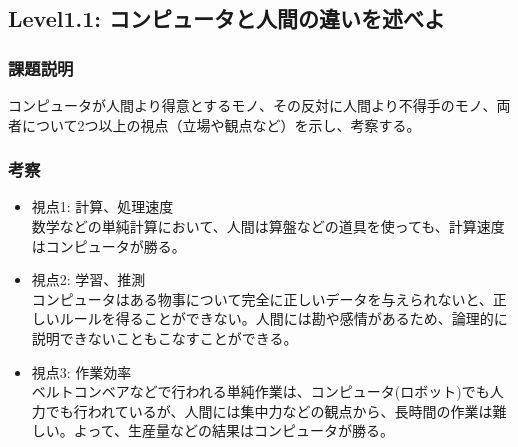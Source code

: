 \subsection{Level1.1: コンピュータと人間の違いを述べよ}
\subsubsection{課題説明}
コンピュータが人間より得意とするモノ、その反対に人間より不得手のモノ、両者について2つ以上の視点（立場や観点など）を示し、考察する。

\subsubsection{考察}
\begin{itemize}
 \item 視点1: 計算、処理速度\\
数学などの単純計算において、人間は算盤などの道具を使っても、計算速度はコンピュータが勝る。
 \item 視点2: 学習、推測\\
コンピュータはある物事について完全に正しいデータを与えられないと、正しいルールを得ることができない。人間には勘や感情があるため、論理的に説明できないこともこなすことができる。
 \item 視点3: 作業効率\\
ベルトコンベアなどで行われる単純作業は、コンピュータ(ロボット)でも人力でも行われているが、人間には集中力などの観点から、長時間の作業は難しい。よって、生産量などの結果はコンピュータが勝る。
\end{itemize}
